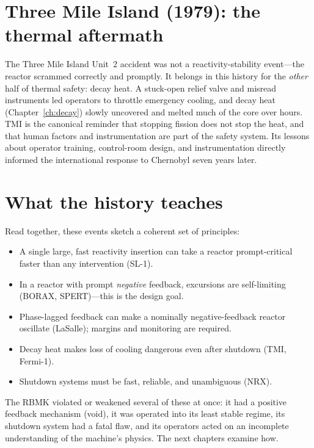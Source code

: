 \section{Three Mile Island (1979): the thermal aftermath}

The Three Mile Island Unit~2 accident was not a reactivity-stability event---the
reactor scrammed correctly and promptly. It belongs in this history for the
\emph{other} half of thermal safety: decay heat. A stuck-open relief valve and
misread instruments led operators to throttle emergency cooling, and decay heat
(Chapter~\ref{ch:decay}) slowly uncovered and melted much of the core over hours.
TMI is the canonical reminder that stopping fission does not stop the heat, and
that human factors and instrumentation are part of the safety system. Its lessons
about operator training, control-room design, and instrumentation directly
informed the international response to Chernobyl seven years later.

\section{What the history teaches}

Read together, these events sketch a coherent set of principles:
\begin{itemize}[nosep]
\item A single large, fast reactivity insertion can take a reactor prompt-critical
faster than any intervention (SL-1).
\item In a reactor with prompt \emph{negative} feedback, excursions are
self-limiting (BORAX, SPERT)---this is the design goal.
\item Phase-lagged feedback can make a nominally negative-feedback reactor
oscillate (LaSalle); margins and monitoring are required.
\item Decay heat makes loss of cooling dangerous even after shutdown (TMI,
Fermi-1).
\item Shutdown systems must be fast, reliable, and unambiguous (NRX).
\end{itemize}
The RBMK violated or weakened several of these at once: it had a positive feedback
mechanism (void), it was operated into its least stable regime, its shutdown
system had a fatal flaw, and its operators acted on an incomplete understanding of
the machine's physics. The next chapters examine how.


